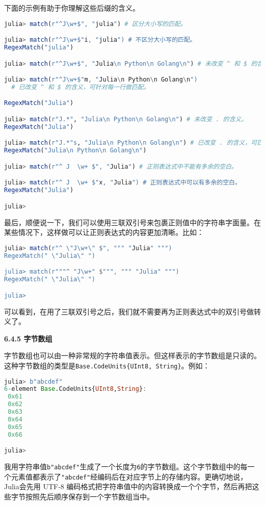 下面的示例有助于你理解这些后缀的含义。
\begin{lstlisting}[language=julia]
julia> match(r"^J\w+$", "julia") # 区分大小写的匹配。

julia> match(r"^J\w+$"i, "julia") # 不区分大小写的匹配。
RegexMatch("julia")

julia> match(r"^J\w+$", "Julia\n Python\n Golang\n") # 未改变 ^ 和 $ 的含义。

julia> match(r"^J\w+$"m, "Julia\n Python\n Golang\n") 
  # 已改变 ^ 和 $ 的含义，可针对每一行做匹配。

RegexMatch("Julia")

julia> match(r"J.*", "Julia\n Python\n Golang\n") # 未改变 . 的含义。
RegexMatch("Julia")

julia> match(r"J.*"s, "Julia\n Python\n Golang\n") # 已改变 . 的含义，可匹配换行。
RegexMatch("Julia\n Python\n Golang\n")

julia> match(r"^ J  \w+ $", "Julia") # 正则表达式中不能有多余的空白。

julia> match(r"^ J  \w+ $"x, "Julia") # 正则表达式中可以有多余的空白。
RegexMatch("Julia")

julia> 
\end{lstlisting}

最后，顺便说一下，我们可以使用三联双引号来包裹正则值中的字符串字面量。在某些情况下，这样做可以让正则表达式的内容更加清晰。比如：
\begin{lstlisting}[language=julia]
julia> match(r"^ \"J\w+\" $", """ "Julia" """)
RegexMatch(" \"Julia\" ")

julia> match(r"""^ "J\w+" $""", """ "Julia" """)
RegexMatch(" \"Julia\" ")

julia> 
\end{lstlisting}

可以看到，在用了三联双引号之后，我们就不需要再为正则表达式中的双引号做转义了。

\textbf{6.4.5 字节数组}

字节数组也可以由一种非常规的字符串值表示。但这样表示的字节数组是只读的。这种字节数组的类型是\verb|Base.CodeUnits{UInt8, String}|。例如：
\begin{lstlisting}[language=julia]
julia> b"abcdef"
6-element Base.CodeUnits{UInt8,String}:
 0x61
 0x62
 0x63
 0x64
 0x65
 0x66

julia>
\end{lstlisting}

我用字符串值\verb|b"abcdef"|生成了一个长度为\verb|6|的字节数组。这个字节数组中的每一个元素值都表示了\verb|"abcdef"|经编码后在对应字节上的存储内容。更确切地说，Julia会先用 UTF-8 编码格式把字符串值中的内容转换成一个个字节，然后再把这些字节按照先后顺序保存到一个字节数组当中。

